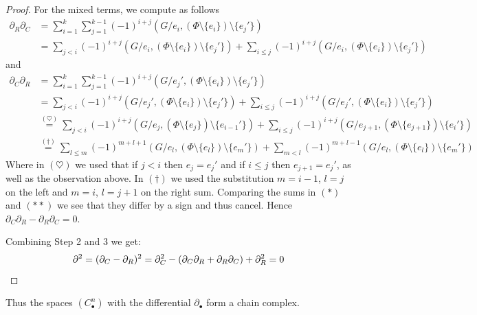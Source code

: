 \begin{proof}
	For the mixed terms, we compute as follows
	\begin{align*}
		\partial_{R} \partial_{C} &=  \sum_{i=1}^{k} \sum_{j=1}^{k-1} (-1)^{i+j}(G / e_{i}, (\Phi \setminus \{e_{i}\} ) \setminus \{e_{j}'\})  \\
					   &= \sum_{j < i} (-1)^{i+j} (G / e_{i}, (\Phi \setminus \{e_{i}\} ) \setminus \{e_{j}'\}) + \sum_{i \leq j} (-1)^{i+j}
					   (G / e_{i}, (\Phi \setminus \{e_{i}\} ) \setminus \{e_{j}'\}) \tag{$*$}
	\end{align*}
	and
	\begin{align*}
		\partial_{C} \partial_{R} &=  \sum_{i=1}^{k} \sum_{j=1}^{k-1} (-1)^{i+j}(G / e_{j}', (\Phi \setminus \{e_{i}\} ) \setminus \{e_{j}'\})  \\
					   &= \sum_{j < i} (-1)^{i+j} (G / e_{j}', (\Phi \setminus \{e_{i}\} ) \setminus \{e_{j}'\}) + \sum_{i \leq j} (-1)^{i+j}
					   (G / e_{j}', (\Phi \setminus \{e_{i}\} ) \setminus \{e_{j}'\}) \\
					   &\stackrel{(\heartsuit)}{=} \sum_{j < i} (-1)^{i+j} (G / e_{j}, (\Phi \setminus \{e_{j}\} ) \setminus \{e_{i-1}'\}) + \sum_{i \leq j} (-1)^{i+j}
					   (G / e_{j+1}, (\Phi \setminus \{e_{j+1}\} ) \setminus \{e_{i}'\}) \\
					   &\stackrel{(\dagger)}{=} \sum_{l \leq m} (-1)^{m+l+1} (G / e_{l}, (\Phi \setminus \{e_{l}\} ) \setminus \{e_{m}'\}) + \sum_{m < l} (-1)^{m+l-1}
					   (G / e_{l}, (\Phi \setminus \{e_{l}\} ) \setminus \{e_{m}'\}) \tag{$* *$}
	\end{align*}
	Where in $(\heartsuit)$ we used that if $j < i$ then $e_{j} = e_{j}'$ and if $i \leq j$ then $e_{j+1} = e_{j}'$, as well as the observation above.
	In $(\dagger)$ we used the substitution  $m = i-1$,  $l = j$ on the left and  $m = i$,  $l = j+1$ on the right sum.
	Comparing the sums in $(*)$ and $(* *)$ we see that they differ by a sign and thus cancel. Hence  $\partial_{C} \partial_{R} - \partial_{R} \partial_{C} = 0$.

	Combining Step 2 and 3 we get:
	\[
		\partial^2 = (\partial_{C} - \partial_{R})^2 = \partial_{C}^2 - (\partial_{C} \partial_{R} + \partial_{R} \partial_{C}) + \partial_{R}^2 = 0\qedhere
	\]
\end{proof}

Thus the spaces $(C^{n}_{\bullet})$ with the differential $\partial_{\bullet}$ form a chain complex.

